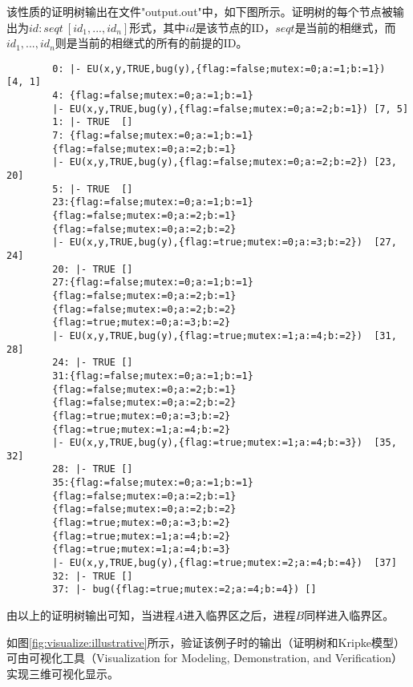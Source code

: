 \begin{example}
	该性质的证明树输出在文件"output.out"中，如下图所示。证明树的每个节点被输出为${id: seqt ~ [id_1, ..., id_n]}$形式，其中$id$是该节点的ID，$seqt$是当前的相继式，而${id_1,...,id_n}$则是当前的相继式的所有的前提的ID。
	\begin{center}
		\small
		\begin{verbatim}
		0: |- EU(x,y,TRUE,bug(y),{flag:=false;mutex:=0;a:=1;b:=1})	[4, 1]
		4: {flag:=false;mutex:=0;a:=1;b:=1}
		|- EU(x,y,TRUE,bug(y),{flag:=false;mutex:=0;a:=2;b:=1})	[7, 5]
		1: |- TRUE	[]
		7: {flag:=false;mutex:=0;a:=1;b:=1} 
		{flag:=false;mutex:=0;a:=2;b:=1}
		|- EU(x,y,TRUE,bug(y),{flag:=false;mutex:=0;a:=2;b:=2})	[23, 20]
		5: |- TRUE	[]
		23:{flag:=false;mutex:=0;a:=1;b:=1} 
		{flag:=false;mutex:=0;a:=2;b:=1} 
		{flag:=false;mutex:=0;a:=2;b:=2}
		|- EU(x,y,TRUE,bug(y),{flag:=true;mutex:=0;a:=3;b:=2})	[27, 24]
		20: |- TRUE	[]
		27:{flag:=false;mutex:=0;a:=1;b:=1} 
		{flag:=false;mutex:=0;a:=2;b:=1} 
		{flag:=false;mutex:=0;a:=2;b:=2} 
		{flag:=true;mutex:=0;a:=3;b:=2}
		|- EU(x,y,TRUE,bug(y),{flag:=true;mutex:=1;a:=4;b:=2})	[31, 28]
		24: |- TRUE	[]
		31:{flag:=false;mutex:=0;a:=1;b:=1} 
		{flag:=false;mutex:=0;a:=2;b:=1} 
		{flag:=false;mutex:=0;a:=2;b:=2} 
		{flag:=true;mutex:=0;a:=3;b:=2} 
		{flag:=true;mutex:=1;a:=4;b:=2}
		|- EU(x,y,TRUE,bug(y),{flag:=true;mutex:=1;a:=4;b:=3})	[35, 32]
		28: |- TRUE	[]
		35:{flag:=false;mutex:=0;a:=1;b:=1} 
		{flag:=false;mutex:=0;a:=2;b:=1} 
		{flag:=false;mutex:=0;a:=2;b:=2} 
		{flag:=true;mutex:=0;a:=3;b:=2} 
		{flag:=true;mutex:=1;a:=4;b:=2} 
		{flag:=true;mutex:=1;a:=4;b:=3}
		|- EU(x,y,TRUE,bug(y),{flag:=true;mutex:=2;a:=4;b:=4})	[37]
		32: |- TRUE	[]
		37: |- bug({flag:=true;mutex:=2;a:=4;b:=4})	[]
		\end{verbatim}
	\end{center}
	由以上的证明树输出可知，当进程$A$进入临界区之后，进程$B$同样进入临界区。
	
	如图\ref{fig:visualize:illustrative}所示，\sctlprov{}验证该例子时的输出（证明树和Kripke模型）可由可视化工具（Visualization for Modeling, Demonstration, and Verification）实现三维可视化显示。
\end{example}
